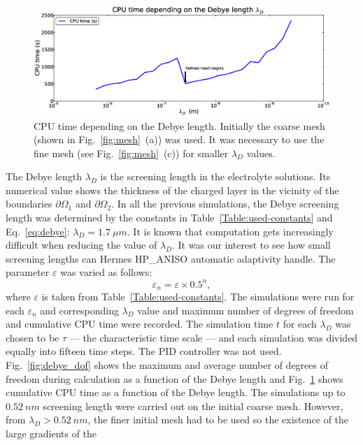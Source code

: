 \begin{figure}[!ht]
  \begin{centering}
  \includegraphics[width=\columnwidth]{debye_cpu}
  \caption{\label{fig:debye_cpu} CPU time depending on the
	Debye length. Initially the coarse mesh (shown in Fig.~\ref{fig:mesh}~(a))
	was used. It was necessary to use the fine mesh (see Fig.~\ref{fig:mesh}~(c)) 
	for smaller $\lambda_D$ values.}
  \end{centering}
\end{figure}
The Debye length $\lambda_D$ is the screening length in the electrolyte
solutions. Its numerical value shows the
thickness of the charged layer in the vicinity of the boundaries $\partial\Omega_1$ 
and $\partial\Omega_2$.
In all the previous simulations, the Debye screening length was determined by  the constants in
Table~\ref{Table:used-constants} and Eq.~\ref{eq:debye}: $\lambda_D=1.7\ \mu m$. It is known that computation gets increasingly
difficult when reducing the value of $\lambda_D$.
It was our interest to see how small screening lengths can Hermes HP\_ANISO automatic
adaptivity handle. The parameter $\varepsilon$ was varied as follows:
$$\varepsilon_n=\varepsilon\times 0.5^n,$$ where $\varepsilon$ is taken from Table~\ref{Table:used-constants}. The simulations were run for each $\varepsilon_n$ and corresponding $\lambda_D$ value
and maximum number of degrees of freedom and cumulative CPU time were recorded.
The simulation time $t$ for each $\lambda_D$ was chosen to be $\tau$ --- the
characteristic time scale --- and each simulation
was divided equally into fifteen time steps. The PID controller was not used.
Fig.~\ref{fig:debye_dof} shows the maximum and average number of degrees of 
freedom during calculation
as a function of the Debye length and Fig.~\ref{fig:debye_cpu} shows cumulative CPU time as a function
of the Debye length. The simulations up to $0.52\ nm$
screening length were carried out on
the initial coarse mesh. However, from $\lambda_D > 0.52\ nm$, the finer initial mesh had to
be used so the existence of the large gradients of the
